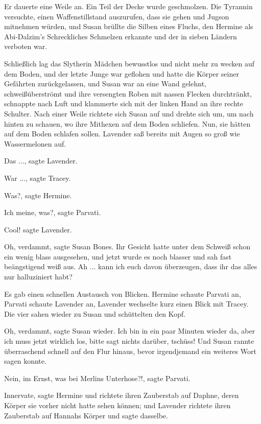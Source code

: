 Er dauerte eine Weile an. Ein Teil der Decke wurde geschmolzen. Die Tyrannin
versuchte, einen Waffenstillstand auszurufen, dass sie gehen und Jugson
mitnehmen würden, und Susan brüllte die Silben eines Fluchs, den Hermine als
Abi-Dalzim's Schreckliches Schmelzen erkannte und der in sieben Ländern verboten
war.

Schließlich lag das Slytherin Mädchen bewusstlos und nicht mehr zu wecken auf
dem Boden, und der letzte Junge war geflohen und hatte die Körper seiner
Gefährten zurückgelassen, und Susan war an eine Wand gelehnt, schweißüberströmt
und ihre versengten Roben mit nassen Flecken durchtränkt, schnappte nach Luft
und klammerte sich mit der linken Hand an ihre rechte Schulter. Nach einer Weile
richtete sich Susan auf und drehte sich um, um nach hinten zu schauen, wo ihre
Mithexen auf dem Boden schliefen. Nun, sie hätten auf dem Boden schlafen sollen.
Lavender saß bereits mit Augen so groß wie Wassermelonen auf.

\glqq{}Das ...\grqq{}, sagte Lavender.

\glqq{}War ...\grqq{}, sagte Tracey.

\glqq{}Was?\grqq{}, sagte Hermine.

\glqq{}Ich meine, was?\grqq{}, sagte Parvati.

\glqq{}Cool!\grqq{} sagte Lavender.

\glqq{}Oh, verdammt\grqq{}, sagte Susan Bones. Ihr Gesicht hatte unter dem
Schweiß schon ein wenig blass ausgesehen, und jetzt wurde es noch blasser und
sah fast beängstigend weiß aus. \glqq{}Ah ... kann ich euch davon überzeugen,
dass ihr das alles nur halluziniert habt?\grqq{}

Es gab einen schnellen Austausch von Blicken. Hermine schaute Parvati an,
Parvati schaute Lavender an, Lavender wechselte kurz einen Blick mit Tracey. Die
vier sahen wieder zu Susan und schüttelten den Kopf.

\glqq{}Oh, verdammt\grqq{}, sagte Susan wieder. \glqq{}Ich bin in ein paar Minuten
wieder da, aber ich muss jetzt wirklich los, bitte sagt nichts darüber,
tschüss!\grqq{} Und Susan rannte überraschend schnell auf den Flur hinaus, bevor
irgendjemand ein weiteres Wort sagen konnte.

\glqq{}Nein, im Ernst, was bei Merlins Unterhose?!\grqq{}, sagte Parvati.

\glqq{}Innervate\grqq{}, sagte Hermine und richtete ihren Zauberstab auf Daphne,
deren Körper sie vorher nicht hatte sehen können; und Lavender richtete ihren
Zauberstab auf Hannahs Körper und sagte dasselbe.

